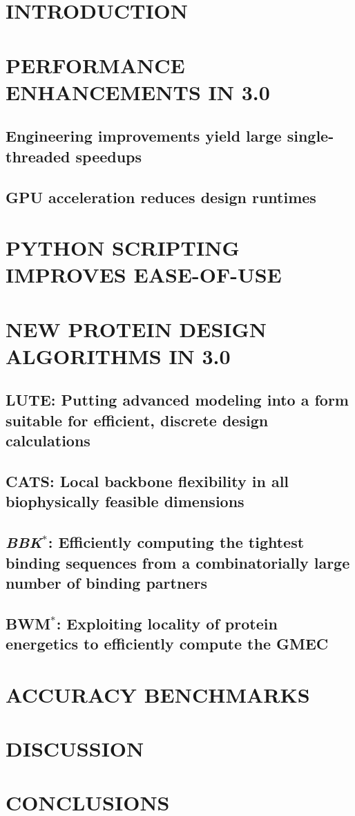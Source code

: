 \documentclass[12pt]{article}
\def\osprey{{\sc{osprey}}\xspace}
\def\bwmstar{BWM$^*$}
\def\bbks{\textit{BBK$^*$}\xspace}
\newcommand{\jccsubsection}[1]{\subsection*{\sffamily \large #1}}
\begin{document}


\renewcommand{\baselinestretch}{1.5}
\normalsize


\clearpage


\section*{\sffamily \Large INTRODUCTION} 


\section*{\sffamily \Large PERFORMANCE ENHANCEMENTS IN \osprey 3.0}
\jccsubsection{Engineering improvements yield large single-threaded speedups}

\jccsubsection{GPU acceleration reduces design runtimes}


\section*{\sffamily \Large PYTHON SCRIPTING IMPROVES EASE-OF-USE}



\section*{\sffamily \Large NEW PROTEIN DESIGN ALGORITHMS IN \osprey 3.0}
\jccsubsection{LUTE: Putting advanced modeling into a form suitable for efficient, discrete design calculations}

\jccsubsection{CATS: Local backbone flexibility in all biophysically feasible dimensions}

\jccsubsection{\bbks: Efficiently computing the tightest binding sequences from a combinatorially large number of binding partners}

\jccsubsection{\bwmstar: Exploiting locality of protein energetics to efficiently compute the GMEC}


\section*{\sffamily \Large ACCURACY BENCHMARKS}


\section*{\sffamily \Large DISCUSSION}


\section*{\sffamily \Large CONCLUSIONS}

\end{document}
